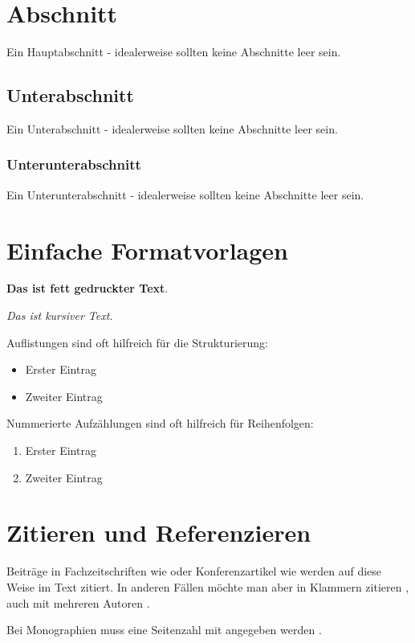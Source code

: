 \documentclass[12pt,oneside]{article}
\begin{document}
\section{Abschnitt} \label{einleitung}
Ein Hauptabschnitt - idealerweise sollten keine Abschnitte leer sein.

\subsection{Unterabschnitt}
Ein Unterabschnitt - idealerweise sollten keine Abschnitte leer sein.

\subsubsection{Unterunterabschnitt}
Ein Unterunterabschnitt - idealerweise sollten keine Abschnitte leer sein.

\section{Einfache Formatvorlagen}

\textbf{Das ist fett gedruckter Text}.

\textit{Das ist kursiver Text}.


Auflistungen sind oft hilfreich für die Strukturierung:
\begin{itemize}
    \item Erster Eintrag
    \item Zweiter Eintrag
\end{itemize}

Nummerierte Aufzählungen sind oft hilfreich für Reihenfolgen:
\begin{enumerate}
    \item Erster Eintrag
    \item Zweiter Eintrag
\end{enumerate}


\section{Zitieren und Referenzieren}

Beiträge in Fachzeitschriften wie \citet{clemen1989combining} oder Konferenzartikel wie \citet{he2017mask} werden auf diese Weise im Text zitiert. In anderen Fällen möchte man aber in Klammern zitieren \citep{clemen1989combining}, auch mit mehreren Autoren \citep{clemen1989combining,baumol1958warehouse,he2017mask}.

Bei Monographien muss eine Seitenzahl mit angegeben werden \citep[S. 28]{chollet2018deep}.
\end{document}
